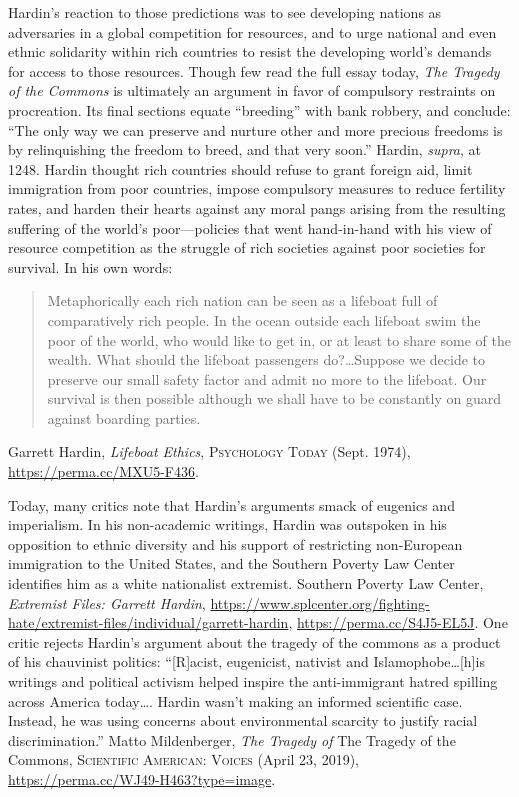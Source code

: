 Hardin's reaction to those predictions was to see developing nations as
adversaries in a global competition for resources, and to urge national and even
ethnic solidarity within rich countries to resist the developing world's demands
for access to those resources. Though few read the full essay today, \textit{The
Tragedy of the Commons} is ultimately an argument in favor of compulsory
restraints on procreation. Its final sections equate ``breeding'' with bank
robbery, and conclude: ``The only way we can preserve and nurture other and more
precious freedoms is by relinquishing the freedom to breed, and that very
soon.'' Hardin, \textit{supra}, at 1248. Hardin thought rich countries should
refuse to grant foreign aid, limit immigration from poor countries, impose
compulsory measures to reduce fertility rates, and harden their hearts against
any moral pangs arising from the resulting suffering of the world's
poor---policies that went hand-in-hand with his view of resource competition as
the struggle of rich societies against poor societies for survival. In his own
words:
\begin{quote}
Metaphorically each rich nation can be seen as a lifeboat full of comparatively
rich people. In the ocean outside each lifeboat swim the poor of the world, who
would like to get in, or at least to share some of the wealth. What should the
lifeboat passengers do?\ldots Suppose we decide to preserve our small safety
factor and admit no more to the lifeboat. Our survival is then possible although
we shall have to be constantly on guard against boarding parties.
\end{quote}
Garrett Hardin, \textit{Lifeboat Ethics},
\textsc{Psychology Today} (Sept. 1974), \url{https://perma.cc/MXU5-F436}. 

Today, many critics note that Hardin's arguments smack of eugenics and
imperialism. In his non-academic writings, Hardin was outspoken in his
opposition to ethnic diversity and his support of restricting non-European
immigration to the United States, and the Southern Poverty Law Center identifies
him as a white nationalist extremist. Southern Poverty Law Center,
\textit{Extremist Files: Garrett Hardin},
\url{https://www.splcenter.org/fighting-hate/extremist-files/individual/garrett-hardin},
\url{https://perma.cc/S4J5-EL5J}. One critic rejects Hardin's argument about the
tragedy of the commons as a product of his chauvinist politics: ``[R]acist,
eugenicist, nativist and Islamophobe\ldots [h]is writings and political activism
helped inspire the anti-immigrant hatred spilling across America today\ldots .
Hardin wasn't making an informed scientific case. Instead, he was using concerns
about environmental scarcity to justify racial discrimination.'' Matto
Mildenberger, \textit{The Tragedy
of} The Tragedy of the Commons, \textsc{Scientific American: Voices} (April 23,
2019), \url{https://perma.cc/WJ49-H463?type=image}. 

